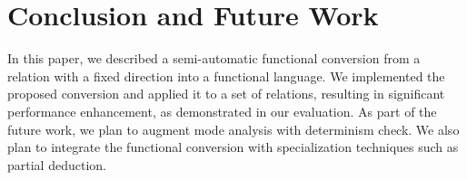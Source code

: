 \section{Conclusion and Future Work}

In this paper, we described a semi-automatic functional conversion from a \mk relation with a fixed direction into a functional language.
We implemented the proposed conversion and applied it to a set of relations, resulting in significant performance enhancement, as demonstrated in our evaluation.  
As part of the future work, we plan to augment mode analysis with determinism check.
We also plan to integrate the functional conversion with specialization techniques such as partial deduction.